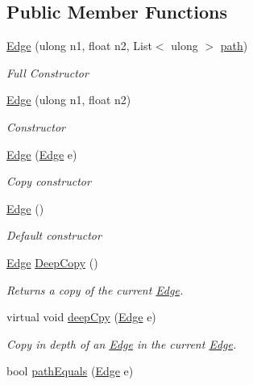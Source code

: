 \subsection*{Public Member Functions}
\begin{DoxyCompactItemize}
\item 
\hyperlink{classEdge_a54518f2f40f38b8701a8b1943101ea2a}{Edge} (ulong n1, float n2, List$<$ ulong $>$ \hyperlink{classEdge_a60f58b7cc5e9f00c8695fce3047933d8}{path})
\begin{DoxyCompactList}\small\item\em Full Constructor \end{DoxyCompactList}\item 
\hyperlink{classEdge_ad61d8cbeee465bf06ff07b30ff694ab5}{Edge} (ulong n1, float n2)
\begin{DoxyCompactList}\small\item\em Constructor \end{DoxyCompactList}\item 
\hyperlink{classEdge_ae20fecc11a724d2b3c828f4f2ab9f838}{Edge} (\hyperlink{classEdge}{Edge} e)
\begin{DoxyCompactList}\small\item\em Copy constructor \end{DoxyCompactList}\item 
\hyperlink{classEdge_acc2a99d2cb4375bd9242a3961bf0bba5}{Edge} ()
\begin{DoxyCompactList}\small\item\em Default constructor \end{DoxyCompactList}\item 
\hyperlink{classEdge}{Edge} \hyperlink{classEdge_aa5f9c64bec6f5fbea2031c711e2ad4e0}{Deep\+Copy} ()
\begin{DoxyCompactList}\small\item\em Returns a copy of the current \hyperlink{classEdge}{Edge}. \end{DoxyCompactList}\item 
virtual void \hyperlink{classEdge_a4257c70fbb9e6c719ea8707a7ad021c5}{deep\+Cpy} (\hyperlink{classEdge}{Edge} e)
\begin{DoxyCompactList}\small\item\em Copy in depth of an \hyperlink{classEdge}{Edge} in the current \hyperlink{classEdge}{Edge}. \end{DoxyCompactList}\item 
bool \hyperlink{classEdge_ab070ab636aed7cb54b6cfc71ccdbf9c6}{path\+Equals} (\hyperlink{classEdge}{Edge} e)

\end{DoxyCompactItemize}
